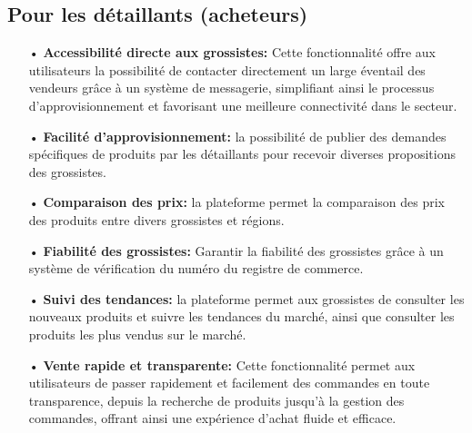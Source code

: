 \documentclass[edit,12pt,a4paper,ChapStyle,oneside,doubleinterligne]{report}
\begin{document}
\subsection{Pour les détaillants (acheteurs)}
\begin{itemize}
    \item [•] \textbf{Accessibilité directe aux grossistes: }Cette fonctionnalité offre aux utilisateurs la possibilité de contacter directement un large éventail des vendeurs grâce à un système de messagerie, simplifiant ainsi le processus d'approvisionnement et favorisant une meilleure connectivité dans le secteur.
    \item [•] \textbf{Facilité d'approvisionnement: }la possibilité de publier des demandes spécifiques de produits par les détaillants  pour recevoir diverses propositions des grossistes.
    \item [•] \textbf{Comparaison des prix: }la plateforme permet la comparaison des prix des produits entre divers grossistes et régions.
    \item [•] \textbf{Fiabilité des grossistes: }Garantir la fiabilité des grossistes grâce à un système de vérification du numéro du registre de commerce.
    \item [•] \textbf{Suivi des tendances: }la plateforme permet aux grossistes de consulter les nouveaux produits et suivre les tendances du marché, ainsi que consulter les produits les plus vendus sur le marché.
    \item [•] \textbf{Vente rapide et transparente: }Cette fonctionnalité permet aux utilisateurs de passer rapidement et facilement des commandes en toute transparence, depuis la recherche de produits jusqu'à la gestion des commandes, offrant ainsi une expérience d'achat fluide et efficace.
\end{itemize}
\end{document}
